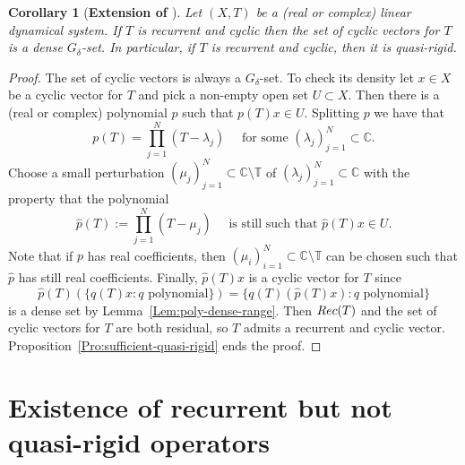 \documentclass[openright,11pt]{article}
\theoremstyle{plain}
\newtheorem{corollary}[theorem]{Corollary}
\theoremstyle{definition}
\newcommand{\CC}{\mathbb{C}}
\newcommand{\TT}{\mathbb{T}}
\newcommand{\Rec}{\textup{Rec}}
\begin{document}
\begin{corollary}[\textbf{Extension of \cite[Corollary 9.2]{CoMaPa2014}}]\label{Cor:Rec+Cyc}
	Let $(X,T)$ be a (real or complex) linear dynamical system. If $T$ is recurrent and cyclic then the set of cyclic vectors for $T$ is a dense $G_{\delta}$-set. In particular, if $T$ is recurrent and cyclic, then it is quasi-rigid.
\end{corollary}
\begin{proof}
	The set of cyclic vectors is always a $G_{\delta}$-set. To check its density let $x \in X$ be a cyclic vector for $T$ and pick a non-empty open set $U \subset X$. Then there is a (real or complex) polynomial $p$ such that $p(T)x \in U$. Splitting $p$ we have that
	\[
	\textstyle p(T) = \prod_{j=1}^N (T-\lambda_j) \quad \text{ for some } (\lambda_j)_{j=1}^N \subset \CC.
	\]
	Choose a small perturbation $(\mu_j)_{j=1}^N \subset \CC\setminus\TT$ of $(\lambda_j)_{j=1}^N \subset \CC$ with the property that the polynomial
	\[
	\textstyle \widehat{p}(T) := \prod_{j=1}^N (T-\mu_j) \quad \text{ is still such that } \widehat{p}(T)x \in U.
	\]
	Note that if $p$ has real coefficients, then $(\mu_i)_{i=1}^N \subset \CC\setminus\TT$ can be chosen such that $\widehat{p}$ has still real coefficients. Finally, $\widehat{p}(T)x$ is a cyclic vector for $T$ since
	\[
	\widehat{p}(T) \left( \{ q(T)x : q \text{ polynomial} \} \right) = \{ q(T)(\widehat{p}(T)x) : q \text{ polynomial} \}
	\]
	is a dense set by Lemma~\ref{Lem:poly-dense-range}. Then $\Rec(T)$ and the set of cyclic vectors for $T$ are both residual, so $T$ admits a recurrent and cyclic vector. Proposition~\ref{Pro:sufficient-quasi-rigid} ends the proof.
\end{proof}



\section{Existence of recurrent but not quasi-rigid operators}\label{Sec:3n-qr}
\end{document}
